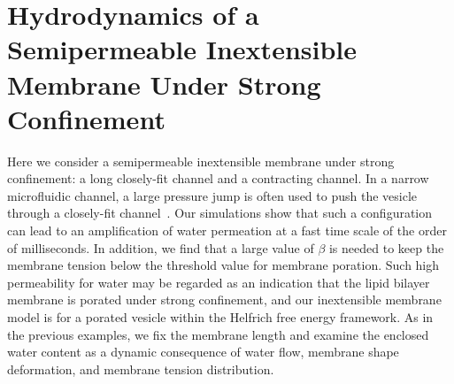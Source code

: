 \documentclass[prb,preprint,showpacs,preprintnumbers,amsmath,amssymb,longbibliography]{revtex4-1}
\begin{document}
\section{Hydrodynamics of a Semipermeable Inextensible Membrane Under Strong Confinement\label{sec:confinement}}
Here we consider a semipermeable inextensible membrane under strong
confinement: a long closely-fit channel and a contracting channel. In a
narrow microfluidic channel, a large pressure jump is often used to push
the vesicle through a closely-fit channel~\cite{abk-fai-sto2006}. Our
simulations show that such a configuration can lead to an amplification
of water permeation at a fast time scale of the order of milliseconds.
In addition, we find that a large value of $\beta$ is needed to keep the
membrane tension below the threshold value for membrane poration. Such
high permeability for water may be regarded as an indication that the
lipid bilayer membrane is porated under strong confinement, and our
inextensible membrane model is for a porated vesicle within the Helfrich
free energy framework. As in the previous examples, we fix the membrane
length and examine the enclosed water content as a dynamic consequence
of water flow, membrane shape deformation, and membrane tension
distribution.


\end{document}
